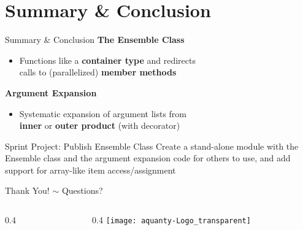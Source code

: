 \documentclass[hyperref={pdfpagelabels=false},compress,final]{beamer}
\newenvironment{myRedBox}[3][upper=upred,lower=lowred,shadow=true]%
{\begin{center} \begin{minipage}{#2} \begin{beamerboxesrounded}[#1]{#3} \smallskip}%
      {\smallskip \end{beamerboxesrounded} \end{minipage} \end{center}}
\begin{document}


\section[\ \ \ ]{Summary \& Conclusion}

\begin{frame}{\hspace*{0.35\textwidth}Summary \& Conclusion}
  \bigskip
  {\Large \color{teal} \textbf{The Ensemble Class} }\smallskip
  \begin{itemize}
    \item Functions like a \textbf{container type} and redirects \\
    calls to (parallelized) \textbf{member methods}
  \end{itemize}
   \medskip
  {\Large {} \textbf{Argument Expansion} }\smallskip
  \begin{itemize}
    \item Systematic expansion of argument lists from \\
    \textbf{inner} or \textbf{outer product} (with decorator)
  \end{itemize}
  \medskip
  \begin{myRedBox}{0.9\textwidth}{Sprint Project: Publish Ensemble Class}
    Create a stand-alone module with the Ensemble class and the argument expansion code for others to use, and add support for array-like item access/assignment
  \end{myRedBox}
\end{frame}

\begin{frame}
  \vspace*{0.2\textheight}
  \begin{center}
    \LARGE
    Thank You!\hspace{1.5cm}  $\sim$ \hspace{1.5cm} Questions?
  \end{center}
  \begin{columns}[T]
   \begin{column}{0.4\textwidth}
     \vspace*{0.1\textheight}
   \end{column}
   \begin{column}{0.4\textwidth}
     \vspace*{0.25\textheight}
     \hfill \texttt{[image: aquanty-Logo\_transparent]}
   \end{column}
 \end{columns}
\end{frame}
\end{document}
